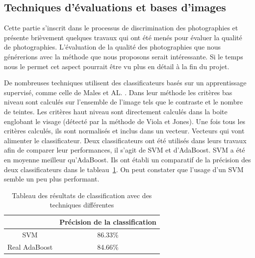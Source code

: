\documentclass[11pt, french]{report-rd-info}
\begin{document}
\subsection{Techniques d’évaluations et bases d’images}

Cette partie s’inscrit dans le processus de discrimination des photographies et présente brièvement quelques travaux qui ont été menés pour évaluer la qualité de photographies. L’évaluation de la qualité des photographies que nous générerions avec la méthode que nous proposons serait intéressante. Si le temps nous le permet cet aspect pourrait être vu plus en détail à la fin du projet. 

De nombreuses techniques utilisent des classificateurs basés sur un apprentissage supervisé, comme celle de Males et AL. \cite{Males2013}. Dans leur méthode les critères bas niveau sont calculés sur l’ensemble de l’image tels que le contraste et le nombre de teintes. Les critères haut niveau sont directement calculés dans la boite englobant le visage (détecté par la méthode de Viola et Jones). Une fois tous les critères calculés, ils sont normalisés et inclus dans un vecteur. Vecteurs qui vont alimenter le classificateur. Deux classificateurs ont été utilisés dans leurs travaux afin de comparer leur performances, il s’agit de SVM et d’AdaBoost. SVM a été en moyenne meilleur qu’AdaBoost. Ils ont établi un comparatif de la précision des deux classificateurs dans le tableau~\ref{tab:ComparaisonSVMAdaBoost}. On peut constater que l'usage d'un SVM semble un peu plus performant.

\begin{table}
\begin{center}
\begin{tabular}{|c|c|}
\hline 
 & Précision de la classification \\ 
\hline 
SVM & 86.33\% \\ 
\hline 
Real AdaBoost & 84.66\% \\ 
\hline 
\end{tabular} 
\end{center}
\caption{Tableau des résultats de classification avec des techniques différentes \cite{Males2013}}
\label{tab:ComparaisonSVMAdaBoost}
\end{table}
\end{document}
